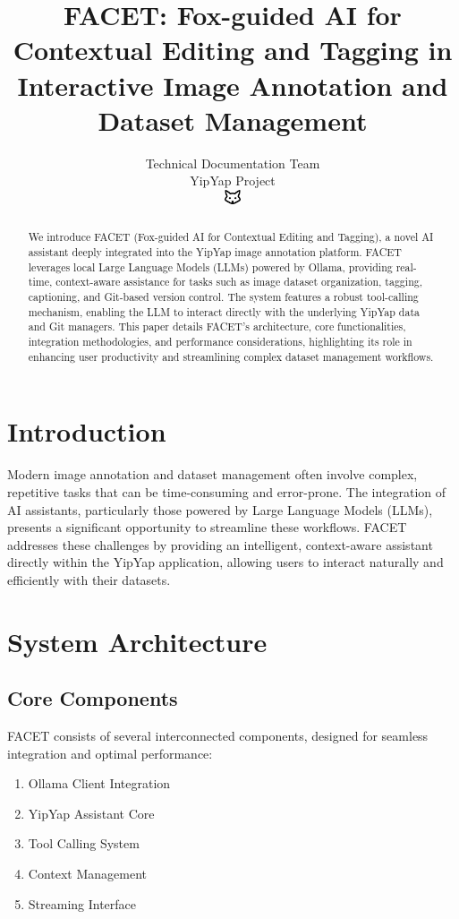 \documentclass[10pt]{article}
\begin{document}
\title{FACET: Fox-guided AI for Contextual Editing and Tagging in Interactive Image Annotation and Dataset Management}

\author{Technical Documentation Team\\
YipYap Project\\
\includegraphics[width=0.5cm]{favicon.pdf}}

\maketitle

\begin{abstract}
We introduce FACET (Fox-guided AI for Contextual Editing and Tagging), a novel AI assistant deeply integrated into the YipYap image annotation platform. FACET leverages local Large Language Models (LLMs) powered by Ollama, providing real-time, context-aware assistance for tasks such as image dataset organization, tagging, captioning, and Git-based version control. The system features a robust tool-calling mechanism, enabling the LLM to interact directly with the underlying YipYap data and Git managers. This paper details FACET's architecture, core functionalities, integration methodologies, and performance considerations, highlighting its role in enhancing user productivity and streamlining complex dataset management workflows.
\end{abstract}

\section{Introduction}
Modern image annotation and dataset management often involve complex, repetitive tasks that can be time-consuming and error-prone. The integration of AI assistants, particularly those powered by Large Language Models (LLMs), presents a significant opportunity to streamline these workflows. FACET addresses these challenges by providing an intelligent, context-aware assistant directly within the YipYap application, allowing users to interact naturally and efficiently with their datasets.

\section{System Architecture}
\subsection{Core Components}
FACET consists of several interconnected components, designed for seamless integration and optimal performance:
\begin{enumerate}
    \item Ollama Client Integration
    \item YipYap Assistant Core
    \item Tool Calling System
    \item Context Management
    \item Streaming Interface
\end{enumerate}
\end{document}

